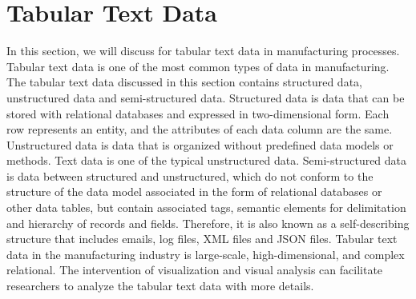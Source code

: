 \documentclass[a4paper,fleqn]{cas-dc}
\begin{document}
\section{Tabular Text Data}
In this section, we will discuss for tabular text data in manufacturing processes.
Tabular text data is one of the most common types of data in manufacturing. The tabular text data discussed in this section contains structured data, unstructured data and semi-structured data.
Structured data is data that can be stored with relational databases and expressed in two-dimensional form. Each row represents an entity, and the attributes of each data column are the same.
Unstructured data is data that is organized without predefined data models or methods. Text data is one of the typical unstructured data.
Semi-structured data is data between structured and unstructured, which do not conform to the structure of the data model associated in the form of relational databases or other data tables, but contain associated tags, semantic elements for delimitation and hierarchy of records and fields. Therefore, it is also known as a self-describing structure that includes emails, log files, XML files and JSON files.
Tabular text data in the manufacturing industry is large-scale, high-dimensional, and complex relational. The intervention of visualization and visual analysis can facilitate researchers to analyze the tabular text data with more details.
\end{document}
